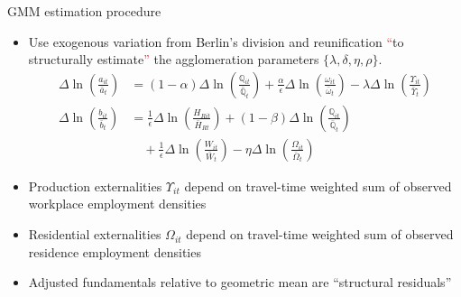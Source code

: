 \documentclass[11pt,notes=hide,aspectratio=169]{beamer}
\begin{document}
\begin{frame}{GMM estimation procedure}
\begin{itemize}
\item Use exogenous variation from Berlin's division and reunification \textcolor{red}{``}to structurally estimate\textcolor{red}{''} the agglomeration parameters $\{\lambda,\delta,\eta,\rho\}$.
\begin{align*}
\Delta \ln\left(\frac{a_{it}}{\bar{a}_{t}} \right) 
&=
(1-\alpha) \Delta \ln \left(\frac{\mathbb{Q}_{it}}{\bar{\mathbb{Q}}_t} \right) + \frac{\alpha}{\epsilon} \Delta \ln \left(\frac{\omega_{it}}{\bar{\omega}_t} \right) - \lambda \Delta \ln \left( \frac{\Upsilon_{it}}{\bar{\Upsilon}_{t}} \right)
\\
\Delta \ln\left(\frac{b_{it}}{\bar{b}_{t}} \right) 
&=
\frac{1}{\epsilon} \Delta \ln \left(\frac{H_{Rit}}{\bar{H}_{Rt}} \right) +  (1-\beta) \Delta \ln \left(\frac{\mathbb{Q}_{it}}{\bar{\mathbb{Q}}_t} \right) \\
&\quad
+ \frac{1}{\epsilon} \Delta \ln \left(\frac{W_{it}}{\bar{W}_t} \right)   - \eta \Delta \ln \left( \frac{\Omega_{it}}{\bar{\Omega}_{t}} \right)
\end{align*}
\item Production externalities $\Upsilon_{it}$ depend on travel-time weighted sum of observed workplace employment densities
\item Residential externalities $\Omega_{it}$ depend on travel-time weighted sum of observed residence employment densities
\item Adjusted fundamentals relative to geometric mean are ``structural residuals''
\end{itemize}
\end{frame}
\end{document}

